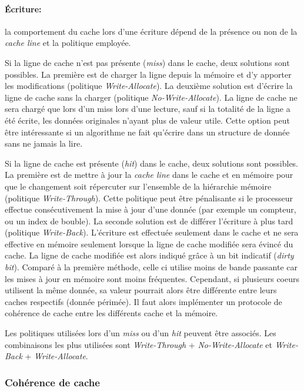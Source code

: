 \paragraph{Écriture:} la comportement du cache lors d'une écriture dépend de la présence ou non de la \textit{cache line} et la politique employée.

Si la ligne de cache n’est pas présente (\textit{miss}) dans le cache, deux solutions sont possibles. La première est de charger la ligne depuis la mémoire et d’y apporter les modifications (politique \textit{Write-Allocate}). La deuxième solution est d’écrire la ligne de cache sans la charger (politique \textit{No-Write-Allocate}). La ligne de cache ne sera chargé que lors d’un miss lors d’une lecture, sauf si la totalité de la ligne a été écrite, les données originales n'ayant plus de valeur utile. Cette option peut être intéressante si un algorithme ne fait qu’écrire dans un structure de donnée sans ne jamais la lire.

Si la ligne de cache est présente (\textit{hit}) dans le cache, deux solutions sont possibles. La première est de mettre à jour la \textit{cache line} dans le cache et en mémoire pour que le changement soit répercuter sur l'ensemble de la hiérarchie mémoire (politique \textit{Write-Through}). Cette politique peut être pénalisante si le processeur effectue consécutivement la mise à jour d'une donnée (par exemple un compteur, ou un index de bouble).  La seconde solution est de différer l'écriture à plus tard (politique \textit{Write-Back}). L’écriture est effectuée seulement dans le cache et ne sera effective en mémoire seulement lorsque la ligne de cache modifiée sera évincé du cache. La ligne de cache modifiée est alors indiqué grâce à un bit indicatif (\textit{dirty bit}). Comparé à la première méthode, celle ci utilise moins de bande passante car les mises à jour en mémoire sont moins fréquentes. Cependant, si plusieurs coeurs utilisent la même donnée, sa valeur pourrait alors être différente entre leurs caches respectifs (donnée périmée). Il faut alors implémenter un protocole de cohérence de cache entre les différents cache et la mémoire.

Les politiques utilisées lors d'un \textit{miss} ou d'un \textit{hit} peuvent être associés. Les combinaisons les plus utilisées sont \textit{Write-Through} + \textit{No-Write-Allocate} et \textit{Write-Back} + \textit{Write-Allocate}.






\subsubsection{Cohérence de cache} \label{sec:cache_coherence}

